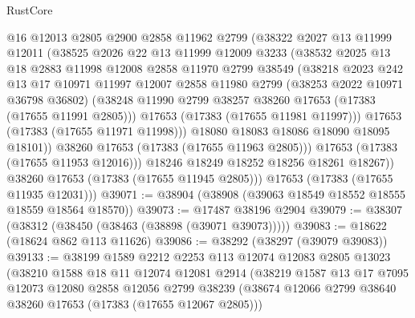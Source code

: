 \begin{lexlean}{RustCore}
\begin{coremodule}
                @16
                @12013
                @2805
                @2900
                @2858
                @11962
                @2799
                (@38322
                  @2027
                  @13
                  @11999
                  @12011
                  (@38525
                    @2026
                    @22
                    @13
                    @11999
                    @12009
                    @3233
                    (@38532
                      @2025
                      @13
                      @18
                      @2883
                      @11998
                      @12008
                      @2858
                      @11970
                      @2799
                      @38549
                      (@38218
                        @2023
                        @242
                        @13
                        @17
                        @10971
                        @11997
                        @12007
                        @2858
                        @11980
                        @2799
                        (@38253 @2022 @10971 @36798 @36802)
                        (@38248 @11990 @2799 @38257 @38260 @17653 (@17383 (@17655 @11991 @2805)))
                        @17653
                        (@17383 (@17655 @11981 @11997)))
                      @17653
                      (@17383 (@17655 @11971 @11998)))
                    @18080
                    @18083
                    @18086
                    @18090
                    @18095
                    @18101))
                @38260
                @17653
                (@17383 (@17655 @11963 @2805)))
              @17653
              (@17383 (@17655 @11953 @12016)))
            @18246
            @18249
            @18252
            @18256
            @18261
            @18267))
        @38260
        @17653
        (@17383 (@17655 @11945 @2805)))
      @17653
      (@17383 (@17655 @11935 @12031)))
@39071 := @38904 (@38908 (@39063 @18549 @18552 @18555 @18559 @18564 @18570))
@39073 := @17487 @38196 @2904
@39079 := @38307 (@38312 (@38450 (@38463 (@38898 (@39071 @39073)))))
@39083 := @18622 (@18624 @862 @113 @11626)
@39086 := @38292 (@38297 (@39079 @39083))
@39133 := @38199
    @1589
    @2212
    @2253
    @113
    @12074
    @12083
    @2805
    @13023
    (@38210
      @1588
      @18
      @11
      @12074
      @12081
      @2914
      (@38219
        @1587
        @13
        @17
        @7095
        @12073
        @12080
        @2858
        @12056
        @2799
        @38239
        (@38674 @12066 @2799 @38640 @38260 @17653 (@17383 (@17655 @12067 @2805)))

\end{coremodule}
\end{lexlean}

